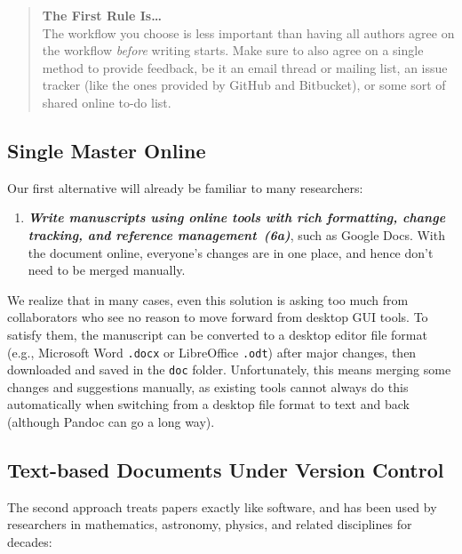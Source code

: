 \documentclass[10pt,letterpaper]{article}
\newcommand{\withurl}[2]{{#1}}
\newcommand{\practice}[2]{\textbf{\emph{{#2}~({#1})}}}
\begin{document}
\begin{quote}
  \noindent \textbf{The First Rule Is{\ldots}}
  \\
  The workflow you choose is less important than having all authors
  agree on the workflow \emph{before} writing starts. Make sure to
  also agree on a single method to provide feedback, be it an email
  thread or mailing list, an issue tracker (like the ones provided by
  GitHub and Bitbucket), or some sort of shared online to-do list.
\end{quote}

\subsection*{Single Master Online}

Our first alternative will already be familiar to many researchers:

\begin{enumerate}

\item

  \practice{6a}{Write manuscripts using online tools with rich
  formatting, change tracking, and reference management}, such as
  Google Docs. With the document online, everyone's changes are in one
  place, and hence don't need to be merged manually.

\end{enumerate}

We realize that in many cases, even this solution is asking too much
from collaborators who see no reason to move forward from desktop GUI
tools. To satisfy them, the manuscript can be converted to a desktop
editor file format (e.g., Microsoft
Word \texttt{.docx} or LibreOffice \texttt{.odt}) after major changes,
then downloaded and saved in the \texttt{doc} folder. Unfortunately,
this means merging some changes and suggestions manually, as existing
tools cannot always do this automatically when switching from a
desktop file format to text and back (although
\withurl{Pandoc}{http://pandoc.org/} can go a long way).

\subsection*{Text-based Documents Under Version Control}

The second approach treats papers exactly like software, and has been
used by researchers in mathematics, astronomy, physics, and related
disciplines for decades:
\end{document}
